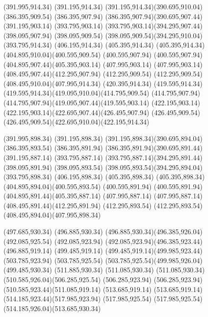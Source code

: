 {{		\moveto(391.995,914.34)
		\lineto(391.195,914.34)
		\curveto(391.195,914.34)(390.695,910.04)(386.395,909.54)
		\lineto(386.395,907.94)
		\curveto(386.395,907.94)(390.695,907.44)(391.195,903.14)
		\lineto(393.795,903.14)
		\curveto(393.795,903.14)(394.295,907.44)(398.095,907.94)
		\lineto(398.095,909.54)
		\curveto(398.095,909.54)(394.295,910.04)(393.795,914.34)
		\closepath
		\moveto(406.195,914.34)
		\lineto(405.395,914.34)
		\curveto(405.395,914.34)(404.895,910.04)(400.595,909.54)
		\lineto(400.595,907.94)
		\curveto(400.595,907.94)(404.895,907.44)(405.395,903.14)
		\lineto(407.995,903.14)
		\curveto(407.995,903.14)(408.495,907.44)(412.295,907.94)
		\lineto(412.295,909.54)
		\curveto(412.295,909.54)(408.495,910.04)(407.995,914.34)
		\closepath
		\moveto(420.395,914.34)
		\lineto(419.595,914.34)
		\curveto(419.595,914.34)(419.095,910.04)(414.795,909.54)
		\lineto(414.795,907.94)
		\curveto(414.795,907.94)(419.095,907.44)(419.595,903.14)
		\lineto(422.195,903.14)
		\curveto(422.195,903.14)(422.695,907.44)(426.495,907.94)
		\lineto(426.495,909.54)
		\curveto(426.495,909.54)(422.695,910.04)(422.195,914.34)
		\closepath
		
		\moveto(391.995,898.34)
		\lineto(391.195,898.34)
		\curveto(391.195,898.34)(390.695,894.04)(386.395,893.54)
		\lineto(386.395,891.94)
		\curveto(386.395,891.94)(390.695,891.44)(391.195,887.14)
		\lineto(393.795,887.14)
		\curveto(393.795,887.14)(394.295,891.44)(398.095,891.94)
		\lineto(398.095,893.54)
		\curveto(398.095,893.54)(394.295,894.04)(393.795,898.34)
		\closepath
		\moveto(406.195,898.34)
		\lineto(405.395,898.34)
		\curveto(405.395,898.34)(404.895,894.04)(400.595,893.54)
		\lineto(400.595,891.94)
		\curveto(400.595,891.94)(404.895,891.44)(405.395,887.14)
		\lineto(407.995,887.14)
		\curveto(407.995,887.14)(408.495,891.44)(412.295,891.94)
		\lineto(412.295,893.54)
		\curveto(412.295,893.54)(408.495,894.04)(407.995,898.34)
		\closepath
		
		\moveto(497.685,930.34)
		\lineto(496.885,930.34)
		\curveto(496.885,930.34)(496.385,926.04)(492.085,925.54)
		\lineto(492.085,923.94)
		\curveto(492.085,923.94)(496.385,923.44)(496.885,919.14)
		\lineto(499.485,919.14)
		\curveto(499.485,919.14)(499.985,923.44)(503.785,923.94)
		\lineto(503.785,925.54)
		\curveto(503.785,925.54)(499.985,926.04)(499.485,930.34)
		\closepath
		\moveto(511.885,930.34)
		\lineto(511.085,930.34)
		\curveto(511.085,930.34)(510.585,926.04)(506.285,925.54)
		\lineto(506.285,923.94)
		\curveto(506.285,923.94)(510.585,923.44)(511.085,919.14)
		\lineto(513.685,919.14)
		\curveto(513.685,919.14)(514.185,923.44)(517.985,923.94)
		\lineto(517.985,925.54)
		\curveto(517.985,925.54)(514.185,926.04)(513.685,930.34)
		\closepath
		
}}

